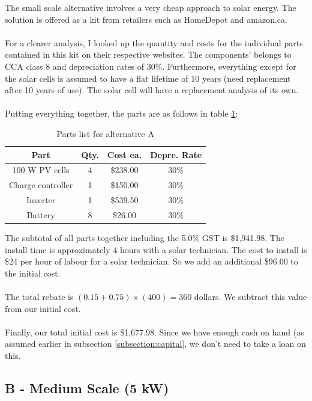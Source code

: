 \documentclass[10pt,letterpaper]{article}
\begin{document}
The small scale alternative involves a very cheap approach to solar energy. The solution is offered as a kit from retailers such as HomeDepot and amazon.ca\cite{amazon-small, homedepot-small}.\\
\\
For a clearer analysis, I looked up the quantity and costs for the individual parts contained in this kit on their respective websites. The components' belongs to CCA class 8 and depreciation rates of 30\%. Furthermore, everything except for the solar cells is assumed to have a flat lifetime of 10 years (need replacement after 10 years of use). The solar cell will have a replacement analysis of its own.\\
\\
Putting everything together, the parts are as follows in table \ref{table:small-parts-list}:

\begin{table}[H]
	\centering
	\begin{tabular}{|c|c|c|c|}
		\hline
		Part&Qty.&Cost ea. & Depre. Rate \\
		\hline
		100 W PV cells & 4 & \$238.00 & 30\%\\
		Charge controller &1& \$150.00&30\%\\
		Inverter &1& \$539.50&30\%\\
		Battery &8& \$26.00&30\%\\
		\hline
	\end{tabular}
	\caption{Parts list for alternative A}
	\label{table:small-parts-list}
\end{table}

The subtotal of all parts together including the 5.0\% GST is \$1,941.98. The install time is approximately 4 hours with a solar technician. The cost to install is \$24 per hour of labour for a solar technician\cite{solar-technicial-1,solar-technicial-2}. So we add an additional \$96.00 to the initial cost.\\
\\
The total rebate is $(0.15+0.75)\times(400)=360$ dollars. We subtract this value from our initial cost.\\
\\
Finally, our total initial cost is  \$1,677.98. Since we have enough cash on hand (as assumed earlier in subsection \ref{subsection:capital}, we don't need to take a loan on this.\\

\subsection{B - Medium Scale (5 kW)}
\end{document}
